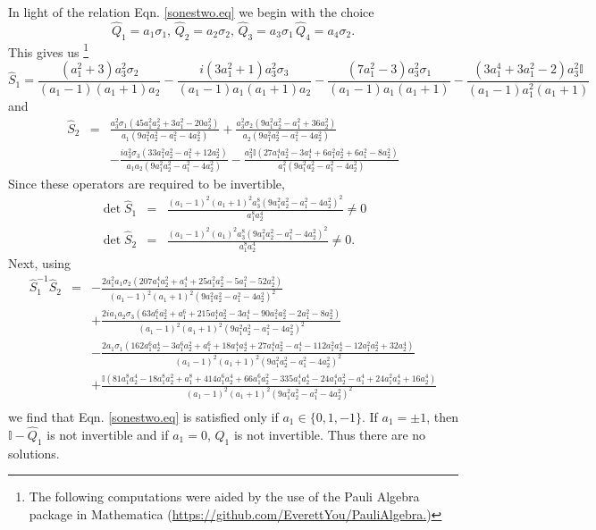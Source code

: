 \documentclass[11pt]{article}
\newcommand{\hQ}{\hat Q}
\newcommand{\h}{\hat}
\begin{document}
In light of the relation Eqn. \eqref{sonestwo.eq} we  begin with the choice 
\begin{equation}
  \hQ_1=a_1\sigma_1,  \, \hQ_2=a_2\sigma_2, \, \hQ_3=a_3\sigma_1 \,
  \hQ_4=a_4\sigma_2. 
\end{equation}
This gives us \footnote{The following
  computations were aided by the use of the Pauli Algebra package in
  Mathematica \cite{PAM} (\url{https://github.com/EverettYou/PauliAlgebra.})}
\begin{equation}
\h S_1 =\frac{\left(a_1^2+3\right) a_3^2 \sigma_2}{(a_1-1) (a_1+1) a_2}-\frac{i \left(3 a_1^2+1\right) a_3^2 \sigma_3}{(a_1-1) a_1 (a_1+1) a_2}-\frac{\left(7 a_1^2-3\right) a_3^2 \sigma_1}{(a_1-1) a_1 (a_1+1)}-\frac{\left(3 a_1^4+3 a_1^2-2\right) a_3^2 \mathbb{I}}{(a_1-1) a_1^2 (a_1+1)}
\end{equation}
and 
\begin{eqnarray}
\h S_2&=& \frac{a_3^2 \sigma_1\left(45 a_1^2 a_2^2+3 a_1^2-20 a_2^2\right)}{a_1 \left(9 a_1^2 a_2^2-a_1^2-4 a_2^2\right)}+\frac{a_3^2 \sigma_2\left(9 a_1^2 a_2^2-a_1^2+36 a_2^2\right)}{a_2\left(9 a_1^2 a_2^2-a_1^2-4 a_2^2\right)}\nonumber\\
&&-\frac{i a_3^2 \sigma_3 \left(33 a_1^2 a_2^2-a_1^2+12 a_2^2\right)}{a_1 a_2 \left(9 a_1^2 a_2^2-a_1^2-4 a_2^2\right)}-\frac{a_3^2 \mathbb{I} \left(27 a_1^4 a_2^2-3 a_1^4+6 a_1^2 a_2^2+6 a_1^2-8 a_2^2\right)}{a_1^2 \left(9 a_1^2 a_2^2-a_1^2-4 a_2^2\right)}
\end{eqnarray}
Since these operators are required to be invertible, 
\begin{eqnarray}
\det \h S_1&=&\frac{(a_1-1)^2 (a_1+1)^2 a_3^8 \left(9 a_1^2
               a_2^2-a_1^2-4 a_2^2\right)^2}{a_1^8 a_2^4} \neq 0 \nonumber\\
\det \h S_2&=&\frac{(a_1-1)^2 (a_1)^2 a_3^8 \left(9 a_1^2
               a_2^2-a_1^2-4 a_2^2\right)^2}{a_1^8 a_2^4} \neq 0. 
\end{eqnarray}
Next, using 
\begin{eqnarray}
\h  S_1^{-1}\h S_2&=&-\frac{2 a_1^2 a_1 \sigma_2\left(207 a_1^4 a_2^2+a_1^4+25 a_1^2 a_2^2-5 a_1^2-52 a_2^2\right)}{(a_1-1)^2 (a_1+1)^2 \left(9 a_1^2 a_2^2-a_1^2-4 a_2^2\right)^2}\nonumber\\ 
&&+\frac{2 i a_1a_2\sigma_3 \left(63 a_1^6 a_2^2+a_1^6+215 a_1^4 a_2^2-3 a_1^4-90 a_1^2 a_2^2-2 a_1^2-8 a_2^2\right)}{(a_1-1)^2 (a_1+1)^2 \left(9 a_1^2 a_2^2-a_1^2-4 a_2^2\right)^2}\nonumber\\
&&-\frac{2 a_1 \sigma_1 \left(162 a_1^6 a_2^4-3 a_1^6 a_2^2+a_1^6+18 a_1^4 a_2^4+27 a_1^4 a_2^2-a_1^4-112 a_1^2 a_2^4-12 a_1^2 a_2^2+32 a_2^4\right)}{(a_1-1)^2 (a_1+1)^2 \left(9 a_1^2 a_2^2-a_1^2-4 a_2^2\right)^2}\nonumber\\
&&+\frac{\mathbb{I} \left(81 a_1^8 a_2^4-18 a_1^8 a_2^2+a_1^8+414 a_1^6 a_2^4+66 a_1^6 a_2^2-335 a_1^4 a_2^4-24 a_1^4 a_2^2-a_1^4+24 a_1^2 a_2^4+16 a_2^4\right)}{(a_1-1)^2 (a_1+1)^2 \left(9 a_1^2 a_2^2-a_1^2-4 a_2^2\right)^2}\nonumber\\
&&
\end{eqnarray}
we find that Eqn. \eqref{sonestwo.eq} is satisfied only  if
$a_1\in\{0,1,-1\}$. If $a_1=\pm 1$, then $\mathbb{I}-\hQ_1$ is not
invertible and if $a_1=0$, $\hQ_1$ is not invertible. Thus there are
no solutions. 
\end{document}
